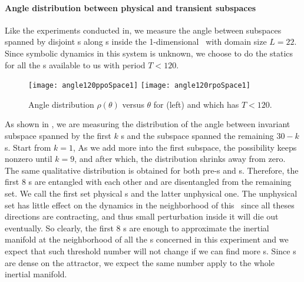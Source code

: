 \paragraph{Angle distribution between physical and transient subspaces}
Like the experiments conducted in, we measure the
angle between subspaces spanned by disjoint \Fv s along \po s inside
the 1-dimensional \KSe\ with domain size $L=22$.
Since symbolic dynamics in this system is unknown, we choose to do the statics
for all the \po s available to us with period $T<120$.
\begin{figure}[h]
  \centering
  \texttt{[image: angle120ppoSpace1]} \hfill
  \texttt{[image: angle120rpoSpace1]}
  \caption{Angle distribution $\rho(\theta)$ versus $\theta$
    for  (left) and  which has $ T < 120$.
  }
  \label{fig:angDist}
\end{figure}
As shown in , we are measuring the distribution of
the angle between invariant subspace spanned by the first $k$ \Fv s
and the subspace spanned the
remaining $30-k$ \Fv s. Start from $k=1$, As we add more into
the first subspace, the possibility keeps nonzero until $k = 9$, and after
which, the distribution shrinks away from zero. The same qualitative
distribution is obtained for both pre-\po s and \rpo s.
Therefore, the first 8 \Fv s are entangled with each other and are
disentangled from the remaining set. We call the first set physical
\Fv s and the latter unphysical one. The unphysical set has little effect
on the dynamics in the neighborhood of this \po\ since all theses directions
are contracting, and thus small perturbation inside it will die out eventually.
So clearly, the first 8 \Fv s are enough to approximate the inertial manifold
at the neighborhood of all the \po s concerned in this
experiment and we expect that such threshold number
will not
change if we can find more \po s.
Since \po s are dense on the attractor, we expect the same number
apply to the whole inertial manifold.

